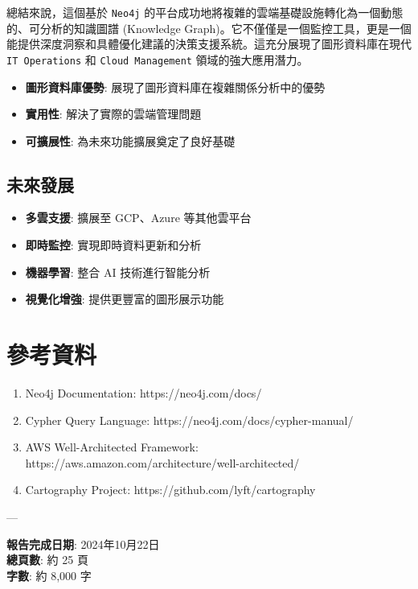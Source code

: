 \documentclass[11pt,a4paper]{ctexart}
\begin{document}
總結來說，這個基於 \texttt{Neo4j} 的平台成功地將複雜的雲端基礎設施轉化為一個動態的、可分析的知識圖譜 (Knowledge Graph)。它不僅僅是一個監控工具，更是一個能提供深度洞察和具體優化建議的決策支援系統。這充分展現了圖形資料庫在現代 \texttt{IT Operations} 和 \texttt{Cloud Management} 領域的強大應用潛力。

\begin{itemize}[leftmargin=1.5em]
\item \textbf{圖形資料庫優勢}: 展現了圖形資料庫在複雜關係分析中的優勢
\item \textbf{實用性}: 解決了實際的雲端管理問題
\item \textbf{可擴展性}: 為未來功能擴展奠定了良好基礎
\end{itemize}

\subsection{未來發展}

\begin{itemize}[leftmargin=1.5em]
\item \textbf{多雲支援}: 擴展至 GCP、Azure 等其他雲平台
\item \textbf{即時監控}: 實現即時資料更新和分析
\item \textbf{機器學習}: 整合 AI 技術進行智能分析
\item \textbf{視覺化增強}: 提供更豐富的圖形展示功能
\end{itemize}

\section{參考資料}

\begin{enumerate}[leftmargin=1.5em]
\item Neo4j Documentation: https://neo4j.com/docs/
\item Cypher Query Language: https://neo4j.com/docs/cypher-manual/
\item AWS Well-Architected Framework: https://aws.amazon.com/architecture/well-architected/
\item Cartography Project: https://github.com/lyft/cartography
\end{enumerate}

---

\textbf{報告完成日期}: 2024年10月22日 \\
\textbf{總頁數}: 約 25 頁 \\
\textbf{字數}: 約 8,000 字
\end{document}
